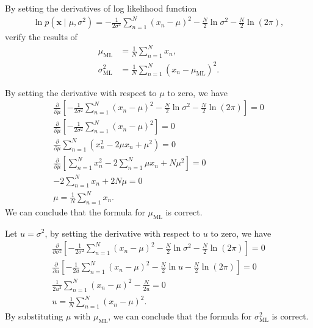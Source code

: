 \begin{question}{1.11}
	By setting the derivatives of log likelihood function
	\begin{align*}
		\ln p(\bm{x} \mid \mu, \sigma^2) = -\frac{1}{2\sigma^2} \sum_{n=1}^{N} (x_n-\mu)^2 -\frac{N}{2}\ln\sigma^2 - \frac{N}{2}\ln(2\pi),
	\end{align*}
	verify the results of
	\begin{align*}
		\mu_{\mathrm{ML}} &= \frac{1}{N} \sum_{n=1}^{N}x_n,\\
		\sigma^2_{\mathrm{ML}} &= \frac{1}{N} \sum_{n=1}^{N} (x_n - \mu_{\mathrm{ML}})^2.
	\end{align*}
\end{question}

\begin{answer}{}
	By setting the derivative with respect to $\mu$ to zero, we have
	\begin{gather}
		\frac{\partial}{\partial \mu} \left[-\frac{1}{2\sigma^2} \sum_{n=1}^{N} (x_n-\mu)^2 -\frac{N}{2}\ln\sigma^2 - \frac{N}{2}\ln(2\pi)\right] = 0\\
		\frac{\partial}{\partial \mu} \left[-\frac{1}{2\sigma^2} \sum_{n=1}^{N} (x_n-\mu)^2 \right] = 0\\
		\frac{\partial}{\partial \mu} \sum_{n=1}^{N} (x_n^2-2\mu x_n + \mu^2) = 0\\
		\frac{\partial}{\partial \mu} \left[ \sum_{n=1}^{N}x_n^2 - 2\sum_{n=1}^{N}\mu x_n + N\mu^2  \right] = 0\\
		-2\sum_{n=1}^{N}x_n + 2N\mu = 0\\
		\mu = \frac{1}{N} \sum_{n=1}^{N} x_n.
	\end{gather}
	We can conclude that the formula for $\mu_{\mathrm{ML}}$ is correct.
	
	Let $u = \sigma^2$, by setting the derivative with respect to $u$ to zero, we have
	\begin{gather*}
		\frac{\partial}{\partial \sigma^2} \left[-\frac{1}{2\sigma^2} \sum_{n=1}^{N} (x_n-\mu)^2 -\frac{N}{2}\ln\sigma^2 - \frac{N}{2}\ln(2\pi)\right] = 0\\
		\frac{\partial}{\partial u} \left[-\frac{1}{2u} \sum_{n=1}^{N} (x_n-\mu)^2 -\frac{N}{2}\ln u - \frac{N}{2}\ln(2\pi)\right] = 0\\
		\frac{1}{2u^2}  \sum_{n=1}^{N} (x_n-\mu)^2 - \frac{N}{2u} = 0\\
		u = \frac{1}{N} \sum_{n=1}^{N} (x_n-\mu)^2.
	\end{gather*}
	By substituting $\mu$ with $\mu_{\mathrm{ML}}$, we can conclude that the formula for $\sigma^2_{\mathrm{ML}}$ is correct.
\end{answer}